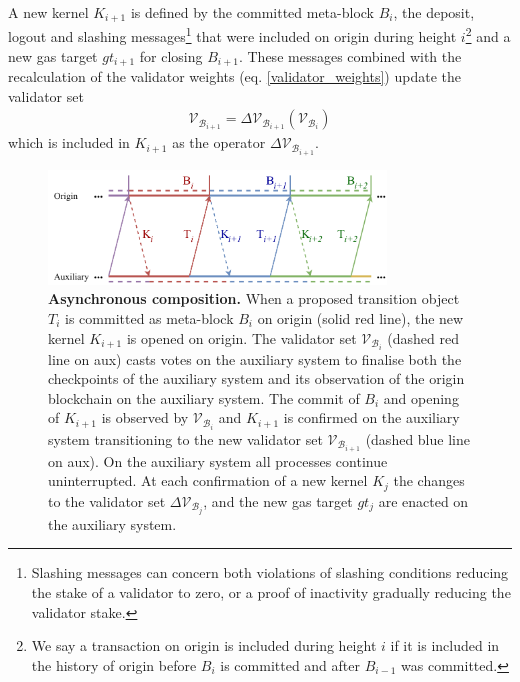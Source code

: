 \documentclass[12pt,a4paper]{article}
\begin{document}
A new kernel $K_{i+1}$ is defined by the committed meta-block $B_i$, the deposit, logout and slashing messages\footnote{
  Slashing messages can concern both violations of slashing conditions reducing the stake of a validator to zero, or a proof of inactivity gradually reducing the validator stake.}
that were included on origin during height $i$\footnote{
  We say a transaction on origin is included during height $i$ if it is included in the history of origin before $B_{i}$ is committed and after $B_{i-1}$ was committed.}
and a new gas target $gt_{i+1}$ for closing $B_{i+1}$.
These messages combined with the recalculation of the validator weights (eq. \ref{validator_weights}) update the validator set
\begin{align}
  \mathcal{V}_{\mathcal{B}_{i+1}} = \Delta\mathcal{V}_{\mathcal{B}_{i+1}}(\mathcal{V}_{\mathcal{B}_{i}})
\end{align}
which is included in $K_{i+1}$ as the operator $\Delta\mathcal{V}_{\mathcal{B}_{i+1}}$. 

\begin{figure}[tb]
    \centering
	\includegraphics[width=0.8\textwidth]{transition}
	\caption{\textbf{Asynchronous composition.}
		When a proposed transition object $T_i$ is committed as meta-block $B_i$ on origin (solid red line), the new kernel $K_{i+1}$ is opened on origin.
		The validator set $\mathcal{V}_{\mathcal{B}_i}$ (dashed red line on aux) casts votes on the auxiliary system to finalise both the checkpoints of the auxiliary system and its observation of the origin blockchain on the auxiliary system.
		The commit of $B_i$ and opening of $K_{i+1}$ is observed by $\mathcal{V}_{\mathcal{B}_i}$ and $K_{i+1}$ is confirmed on the auxiliary system transitioning to the new validator set $\mathcal{V}_{\mathcal{B}_{i+1}}$ (dashed blue line on aux).
		On the auxiliary system all processes continue uninterrupted.
		At each confirmation of a new kernel $K_j$ the changes to the validator set $\Delta\mathcal{V}_{\mathcal{B}_j}$, and the new gas target $gt_j$ are enacted on the auxiliary system.
	}
	\label{fig:asynccomp}
\end{figure}
\end{document}
